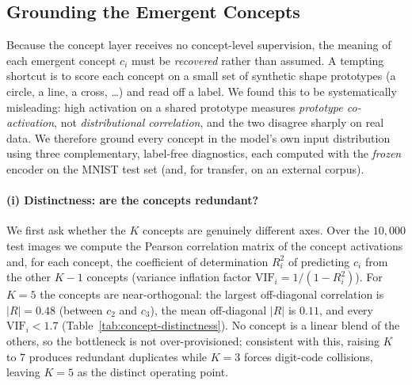 
\subsection{Grounding the Emergent Concepts}
\label{sec:concept-grounding}

Because the concept layer receives no concept-level supervision, the meaning of
each emergent concept $c_i$ must be \emph{recovered} rather than assumed. A
tempting shortcut is to score each concept on a small set of synthetic shape
prototypes (a circle, a line, a cross, \dots) and read off a label. We found
this to be systematically misleading: high activation on a shared prototype
measures \emph{prototype co-activation}, not \emph{distributional correlation},
and the two disagree sharply on real data. We therefore ground every concept in
the model's own input distribution using three complementary, label-free
diagnostics, each computed with the \emph{frozen} encoder on the MNIST test set
(and, for transfer, on an external corpus).

\paragraph{(i) Distinctness: are the concepts redundant?}
We first ask whether the $K$ concepts are genuinely different axes. Over the
$10{,}000$ test images we compute the Pearson correlation matrix of the concept
activations and, for each concept, the coefficient of determination $R^2_i$ of
predicting $c_i$ from the other $K-1$ concepts (variance inflation factor
$\mathrm{VIF}_i = 1/(1-R^2_i)$). For $K=5$ the concepts are near-orthogonal: the
largest off-diagonal correlation is $|R|=0.48$ (between $c_2$ and $c_3$), the
mean off-diagonal $|R|$ is $0.11$, and every $\mathrm{VIF}_i < 1.7$
(Table~\ref{tab:concept-distinctness}). No concept is a linear blend of the
others, so the bottleneck is not over-provisioned; consistent with this, raising
$K$ to $7$ produces redundant duplicates while $K=3$ forces digit-code
collisions, leaving $K=5$ as the distinct operating point.

